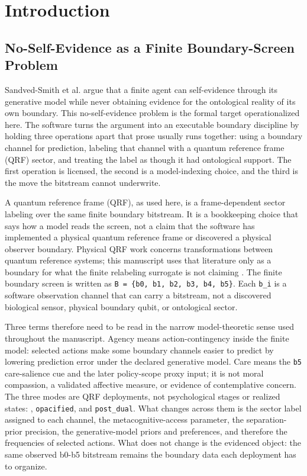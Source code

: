 \documentclass[
]{article}
\begin{document}
\newpage

\section{Introduction}\label{sec:introduction}

\subsection{No-Self-Evidence as a Finite Boundary-Screen
Problem}\label{sec:introduction-paper-source}

Sandved-Smith et al. \citep{sandvedsmith2026noself} argue that a finite
agent can self-evidence through its generative model while never
obtaining evidence for the ontological reality of its own boundary. This
no-self-evidence problem is the formal target operationalized here. The
software turns the argument into an executable boundary discipline by
holding three operations apart that prose usually runs together: using a
boundary channel for prediction, labeling that channel with a quantum
reference frame (QRF) sector, and treating the label as though it had
ontological support. The first operation is licensed, the second is a
model-indexing choice, and the third is the move the bitstream cannot
underwrite.

A quantum reference frame (QRF), as used here, is a frame-dependent
sector labeling over the same finite boundary bitstream. It is a
bookkeeping choice that says how a model reads the screen, not a claim
that the software has implemented a physical quantum reference frame or
discovered a physical observer boundary. Physical QRF work concerns
transformations between quantum reference systems; this manuscript uses
that literature only as a boundary for what the finite relabeling
surrogate is not claiming
\citep{giacomini2019qrf, vanrietvelde2020perspective, bartlett2007reference}.
The finite boundary screen is written as
\texttt{B\ =\ \{b0,\ b1,\ b2,\ b3,\ b4,\ b5\}}. Each \texttt{b\_i} is a
software observation channel that can carry a bitstream, not a
discovered biological sensor, physical boundary qubit, or ontological
sector.

Three terms therefore need to be read in the narrow model-theoretic
sense used throughout the manuscript. Agency means action-contingency
inside the finite model: selected actions make some boundary channels
easier to predict by lowering prediction error under the declared
generative model. Care means the \texttt{b5} care-salience cue and the
later policy-scope proxy input; it is not moral compassion, a validated
affective measure, or evidence of contemplative concern. The three modes
are QRF deployments, not psychological stages or realized states:
, \texttt{opacified}, and
\texttt{post\_dual}. What changes across them is the sector label
assigned to each channel, the metacognitive-access parameter, the
separation-prior precision, the generative-model priors and preferences,
and therefore the frequencies of selected actions. What does not change
is the evidenced object: the same observed b0-b5 bitstream remains the
boundary data each deployment has to organize.
\end{document}
